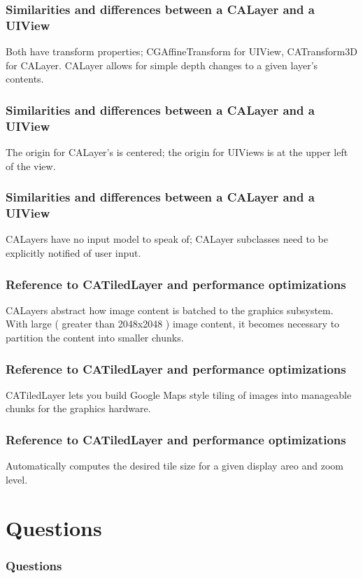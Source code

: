 \documentclass[10pt]{beamer}
\begin{document}
    
\begin{frame}[fragile]
  \frametitle{Similarities and differences between a CALayer and a UIView}
  Both have transform properties; CGAffineTransform for UIView, CATransform3D for CALayer. CALayer allows for simple depth changes to a given layer's contents.

\end{frame}

\begin{frame}[fragile]
  \frametitle{Similarities and differences between a CALayer and a UIView}
  The origin for CALayer's is centered; the origin for UIViews is at the upper left of the view.

\end{frame}

\begin{frame}[fragile]
  \frametitle{Similarities and differences between a CALayer and a UIView}
  CALayers have no input model to speak of; CALayer subclasses need to be explicitly notified of user input.

\end{frame}

    
\begin{frame}[fragile]
  \frametitle{Reference to CATiledLayer and performance optimizations}
  CALayers abstract how image content is batched to the graphics subsystem.  With large ( greater than 2048x2048 ) image content, it becomes necessary to partition the content into smaller chunks.

\end{frame}

\begin{frame}[fragile]
  \frametitle{Reference to CATiledLayer and performance optimizations}
  CATiledLayer lets you build Google Maps style tiling of images into manageable chunks for the graphics hardware.

\end{frame}

\begin{frame}[fragile]
  \frametitle{Reference to CATiledLayer and performance optimizations}
  Automatically computes the desired tile size for a given display areo and zoom level.

\end{frame}

    

   
  

  
\section{Questions}
\begin{frame}[fragile]
  \frametitle{Questions}
  
\end{frame}


  


{}

\end{document}
